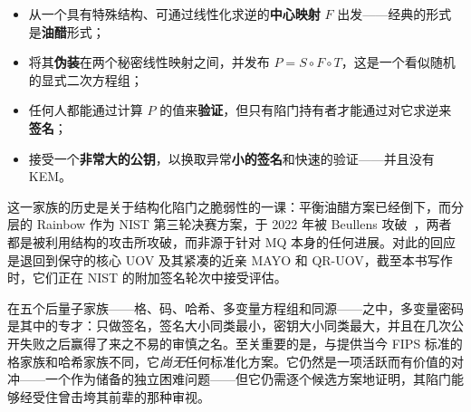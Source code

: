 \begin{itemize}
  \item 从一个具有特殊结构、可通过线性化求逆的\textbf{中心映射} $F$ 出发——经典的形式是\textbf{油醋}形式；
  \item 将其\textbf{伪装}在两个秘密线性映射之间，并发布 $P = S \circ F \circ T$，这是一个看似随机的显式二次方程组；
  \item 任何人都能通过计算 $P$ 的值来\textbf{验证}，但只有陷门持有者才能通过对它求逆来\textbf{签名}；
  \item 接受一个\textbf{非常大的公钥}，以换取异常\textbf{小的签名}和快速的验证——并且没有 KEM。
\end{itemize}

这一家族的历史是关于结构化陷门之脆弱性的一课：平衡油醋方案已经倒下，而分层的 Rainbow 作为 NIST 第三轮决赛方案，于 2022 年被 Beullens 攻破~\cite{beullens2022}，两者都是被利用结构的攻击所攻破，而非源于针对 MQ 本身的任何进展。对此的回应是退回到保守的核心 UOV 及其紧凑的近亲 MAYO 和 QR-UOV，截至本书写作时，它们正在 NIST 的附加签名轮次中接受评估。

在五个后量子家族——格、码、哈希、多变量方程组和同源——之中，多变量密码是其中的专才：只做签名，签名大小同类最小，密钥大小同类最大，并且在几次公开失败之后赢得了来之不易的审慎之名。至关重要的是，与提供当今 FIPS 标准的格家族和哈希家族不同，它\emph{尚无}任何标准化方案。它仍然是一项活跃而有价值的对冲——一个作为储备的独立困难问题——但它仍需逐个候选方案地证明，其陷门能够经受住曾击垮其前辈的那种审视。

\printbibliography[heading=chapterrefs]
